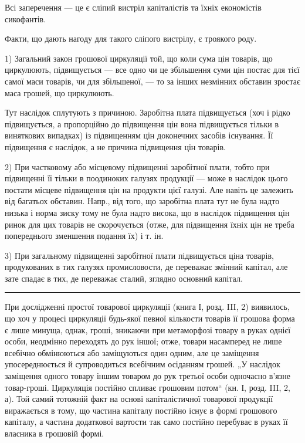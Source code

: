 Всі заперечення — це є сліпий вистріл капіталістів та їхніх економістів
сикофантів.

Факти, що дають нагоду для такого сліпого вистрілу, є троякого роду.

1) Загальний закон грошової циркуляції той, що коли сума цін товарів,
що циркулюють, підвищується — все одно чи це збільшення суми
цін постає для тієї самої маси товарів, чи для збільшеної, — то за інших
незмінних обставин зростає маса грошей, що циркулюють.

Тут наслідок сплутують з причиною. Заробітна плата підвищується (хоч
і рідко підвищується, а пропорційно до підвищення цін вона підвищується
тільки в виняткових випадках) із підвищенням цін доконечних засобів існування.
Її підвищення є наслідок, а не причина підвищення цін товарів.

2) При частковому або місцевому підвищенні заробітної плати, тобто
при підвищенні її тільки в поодиноких галузях продукції — може в наслідок
цього постати місцеве підвищення цін на продукти цієї галузі. Але навіть
це залежить від багатьох обставин. Напр., від того, що заробітна плата
тут не була надто низька і норма зиску тому не була надто висока, що
в наслідок підвищення цін ринок для цих товарів не скорочується
(отже, для підвищення їхніх цін не треба попереднього зменшення
подання їх) і т. ін.

3) При загальному підвищенні заробітної плати підвищується ціна товарів,
продукованих в тих галузях промисловости, де переважає змінний капітал,
але зате спадає в тих, де переважає сталий, зглядно основний капітал.

\pfbreak{}

При дослідженні простої товарової циркуляції (книга І, розд. III, 2) виявилось,
що хоч у процесі циркуляції будь-якої певної кількости товарів її
грошова форма є лише минуща, однак, гроші, зникаючи при метаморфозі
товару в руках однієї особи, неодмінно переходять до рук іншої; отже,
товари насамперед не лише всебічно обмінюються або заміщуються один
одним, але це заміщення упосереднюється й супроводиться всебічним
осіданням грошей. „У наслідок заміщення одного товару іншим товаром
до рук третьої особи одночасно в’язне товар-гроші. Циркуляція постійно
спливає грошовим потом“ (кн. І, розд. III, 2, а). Той самий тотожній
факт на основі капіталістичної товарової продукції виражається в тому,
що частина капіталу постійно існує в формі грошового капіталу, а частина
додаткової вартости так само постійно перебуває в руках її власника
в грошовій формі.


